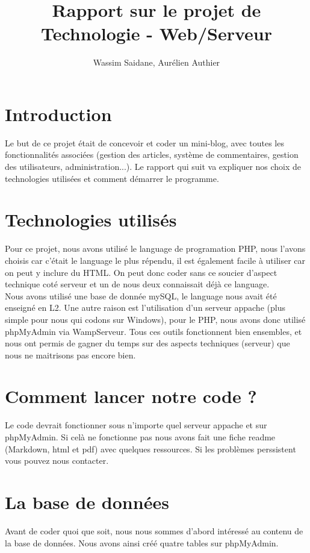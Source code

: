 \documentclass{article}
\title{Rapport sur le projet de Technologie - Web/Serveur}
\author{Wassim Saidane, Aurélien Authier}
\date{}
\begin{document}
    \maketitle
    \tableofcontents
    \newpage
    \section*{Introduction}
    Le but de ce projet était de concevoir et coder un mini-blog, avec toutes les fonctionnalités associées (gestion des articles, système de commentaires, gestion des utilisateurs, administration...). Le rapport qui suit va expliquer nos choix de technologies utilisées et comment démarrer le programme.   

    \section{Technologies utilisés}
    Pour ce projet, nous avons utilisé le language de programation PHP, 
    nous l'avons choisis car c'était le language le plus répendu,
    il est également facile à utiliser car on peut y inclure du HTML. On peut
    donc coder sans ce soucier d'aspect technique coté serveur et un de nous deux 
    connaissait déjà ce language. \\
    Nous avons utilisé une base de donnée mySQL, le language nous avait été enseigné en L2.
    Une autre raison est l'utilisation d'un serveur appache (plus simple pour nous qui codons sur Windows),
    pour le PHP, nous avons donc utilisé phpMyAdmin via WampServeur. Tous ces outils fonctionnent bien ensembles,
    et nous ont permis de gagner du temps sur des aspects techniques (serveur) que nous ne maitrisons pas encore bien.

    \section{Comment lancer notre code ?}
    Le code devrait fonctionner sous n'importe quel serveur appache et sur phpMyAdmin. Si celà ne fonctionne pas nous avons fait une fiche readme (Markdown, html et pdf) avec quelques ressources.
    Si les problèmes perssistent vous pouvez nous contacter.
    \section{La base de données}
    Avant de coder quoi que soit, nous nous sommes d'abord intéressé au contenu de la base de données.
    Nous avons ainsi créé quatre tables sur phpMyAdmin.
\end{document}
